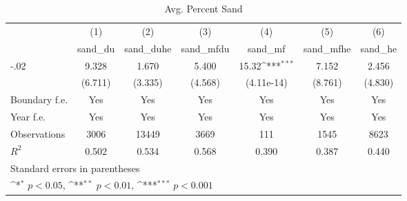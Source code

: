 \begin{table}[htbp]\centering
\def\sym#1{\ifmmode^{#1}\else\(^{#1}\)\fi}
\caption{Avg. Percent Sand}
\begin{tabular}{l*{6}{c}}
\hline\hline
                    &\multicolumn{1}{c}{(1)}&\multicolumn{1}{c}{(2)}&\multicolumn{1}{c}{(3)}&\multicolumn{1}{c}{(4)}&\multicolumn{1}{c}{(5)}&\multicolumn{1}{c}{(6)}\\
                    &\multicolumn{1}{c}{sand\_du}&\multicolumn{1}{c}{sand\_duhe}&\multicolumn{1}{c}{sand\_mfdu}&\multicolumn{1}{c}{sand\_mf}&\multicolumn{1}{c}{sand\_mfhe}&\multicolumn{1}{c}{sand\_he}\\
\hline
-.02                &       9.328         &       1.670         &       5.400         &       15.32\sym{***}&       7.152         &       2.456         \\
                    &     (6.711)         &     (3.335)         &     (4.568)         &  (4.11e-14)         &     (8.761)         &     (4.830)         \\
[1em]
Boundary f.e.       &         Yes         &         Yes         &         Yes         &         Yes         &         Yes         &         Yes         \\
[1em]
Year f.e.           &         Yes         &         Yes         &         Yes         &         Yes         &         Yes         &         Yes         \\
\hline
Observations        &        3006         &       13449         &        3669         &         111         &        1545         &        8623         \\
\(R^{2}\)           &       0.502         &       0.534         &       0.568         &       0.390         &       0.387         &       0.440         \\
\hline\hline
\multicolumn{7}{l}{\footnotesize Standard errors in parentheses}\\
\multicolumn{7}{l}{\footnotesize \sym{*} \(p<0.05\), \sym{**} \(p<0.01\), \sym{***} \(p<0.001\)}\\
\end{tabular}
\end{table}
